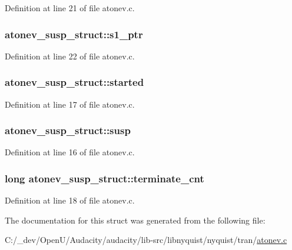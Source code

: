 Definition at line 21 of file atonev.\+c.

\subsubsection[{\texorpdfstring{s1\+\_\+ptr}{s1_ptr}}]{ atonev\+\_\+susp\+\_\+struct\+::s1\+\_\+ptr}\hypertarget{structatonev__susp__struct_a5bfe65a0af9ae16e272c0719a6c32a15}{}\label{structatonev__susp__struct_a5bfe65a0af9ae16e272c0719a6c32a15}


Definition at line 22 of file atonev.\+c.

\subsubsection[{\texorpdfstring{started}{started}}]{ atonev\+\_\+susp\+\_\+struct\+::started}\hypertarget{structatonev__susp__struct_ad9d68f55b2c73326e09aa76254849733}{}\label{structatonev__susp__struct_ad9d68f55b2c73326e09aa76254849733}


Definition at line 17 of file atonev.\+c.

\subsubsection[{\texorpdfstring{susp}{susp}}]{ atonev\+\_\+susp\+\_\+struct\+::susp}\hypertarget{structatonev__susp__struct_aa9e4585a8398f280b3e340e679cf6c36}{}\label{structatonev__susp__struct_aa9e4585a8398f280b3e340e679cf6c36}


Definition at line 16 of file atonev.\+c.

\subsubsection[{\texorpdfstring{terminate\+\_\+cnt}{terminate_cnt}}]{\setlength{\rightskip}{0pt plus 5cm}long atonev\+\_\+susp\+\_\+struct\+::terminate\+\_\+cnt}\hypertarget{structatonev__susp__struct_a788f31e841f41a12d664104329ceadb0}{}\label{structatonev__susp__struct_a788f31e841f41a12d664104329ceadb0}


Definition at line 18 of file atonev.\+c.



The documentation for this struct was generated from the following file\+:\begin{DoxyCompactItemize}
\item 
C\+:/\+\_\+dev/\+Open\+U/\+Audacity/audacity/lib-\/src/libnyquist/nyquist/tran/\hyperlink{atonev_8c}{atonev.\+c}\end{DoxyCompactItemize}
